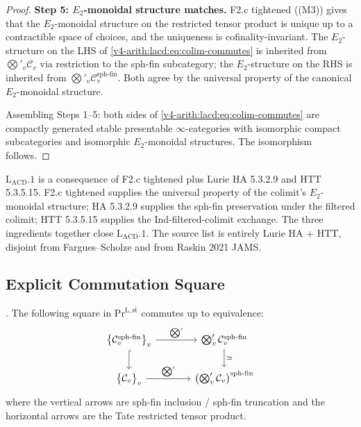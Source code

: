 \begin{proof}
\textbf{Step 5: \(E_{2}\)-monoidal structure matches.} F2.c tightened
((M3)) gives that the
\(E_{2}\)-monoidal structure on the restricted tensor product is
unique up to a contractible space of choices, and the uniqueness is
cofinality-invariant. The \(E_{2}\)-structure on the LHS of
\eqref{v4-arith:lacd:eq:colim-commutes} is inherited from
\(\bigotimes'_{v}\mathcal{C}_{v}\) via restriction to the sph-fin
subcategory; the \(E_{2}\)-structure on the RHS is inherited from
\(\bigotimes'_{v}\mathcal{C}_{v}^{\mathrm{sph\text{-}fin}}\). Both
agree by the universal property of the canonical
\(E_{2}\)-monoidal structure.

Assembling Steps 1--5: both sides of
\eqref{v4-arith:lacd:eq:colim-commutes} are compactly generated
stable presentable \(\infty\)-categories with isomorphic compact
subcategories and isomorphic \(E_{2}\)-monoidal structures. The
isomorphism follows.
\end{proof}

\begin{remark}
\label{v4-arith:lacd:rem:F2c-role}
\(\mathrm{L}_{\mathrm{ACD}}.1\) is a consequence of F2.c tightened plus
Lurie HA 5.3.2.9 and HTT 5.3.5.15. F2.c tightened supplies the
universal property of the colimit's \(E_{2}\)-monoidal structure;
HA 5.3.2.9 supplies the sph-fin preservation under the filtered
colimit; HTT 5.3.5.15 supplies the Ind-filtered-colimit exchange. The
three ingredients together close \(\mathrm{L}_{\mathrm{ACD}}.1\). The
source list is entirely Lurie HA + HTT, disjoint from
Fargues--Scholze and from Raskin 2021 JAMS.
\end{remark}

\subsection{Explicit Commutation Square}

\begin{corollary}
\label{v4-arith:lacd:cor:commutation-square}
\ClaimStatusProvedHere. The following square in
\(\mathrm{Pr}^{\mathrm{L,st}}\) commutes up to equivalence:
\begin{equation}
\begin{tikzcd}[column sep=large]
\bigl\{\mathcal{C}_{v}^{\mathrm{sph\text{-}fin}}\bigr\}_{v} \ar[r, "\bigotimes'"] \ar[d, hook] & \bigotimes'_{v}\mathcal{C}_{v}^{\mathrm{sph\text{-}fin}} \ar[d, "\simeq"] \\
\bigl\{\mathcal{C}_{v}\bigr\}_{v} \ar[r, "\bigotimes'"] & \bigl(\bigotimes'_{v}\mathcal{C}_{v}\bigr)^{\mathrm{sph\text{-}fin}}
\end{tikzcd}
\end{equation}
where the vertical arrows are sph-fin inclusion / sph-fin truncation
and the horizontal arrows are the Tate restricted tensor product.
\end{corollary}

